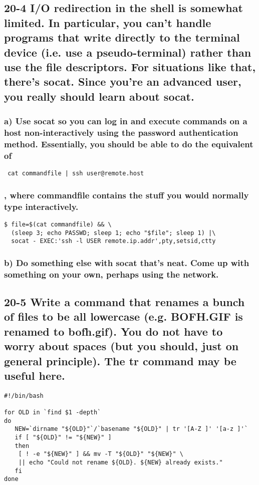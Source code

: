 \subsection{20-4 I/O redirection in the shell is somewhat limited. In particular, you can't handle programs that write directly to the terminal device (i.e. use a pseudo-terminal) rather than use the file descriptors. For situations like that, there's socat. Since you're an advanced user, you really should learn about socat.}
\subsubsection{a) Use socat so you can log in and execute commands on a host non-interactively using the password authentication method. Essentially, you should be able to do the equivalent of}
\verb= cat commandfile | ssh user@remote.host =
\subsubsection{, where commandfile contains the stuff you would normally type interactively.}
\begin{verbatim}
$ file=$(cat commandfile) && \
  (sleep 3; echo PASSWD; sleep 1; echo "$file"; sleep 1) |\
  socat - EXEC:'ssh -l USER remote.ip.addr',pty,setsid,ctty
\end{verbatim}

\subsubsection{b) Do something else with socat that's neat. Come up with something on your own, perhaps using the network.}

\subsection{20-5 Write a command that renames a bunch of files to be all lowercase (e.g. BOFH.GIF is renamed to bofh.gif). You do not have to worry about spaces (but you should, just on general principle). The tr command may be useful here.}
\begin{verbatim}
#!/bin/bash

for OLD in `find $1 -depth`
do
   NEW=`dirname "${OLD}"`/`basename "${OLD}" | tr '[A-Z ]' '[a-z ]'`
   if [ "${OLD}" != "${NEW}" ]
   then
	[ ! -e "${NEW}" ] && mv -T "${OLD}" "${NEW}" \
	|| echo "Could not rename ${OLD}. ${NEW} already exists."
   fi
done
\end{verbatim}

